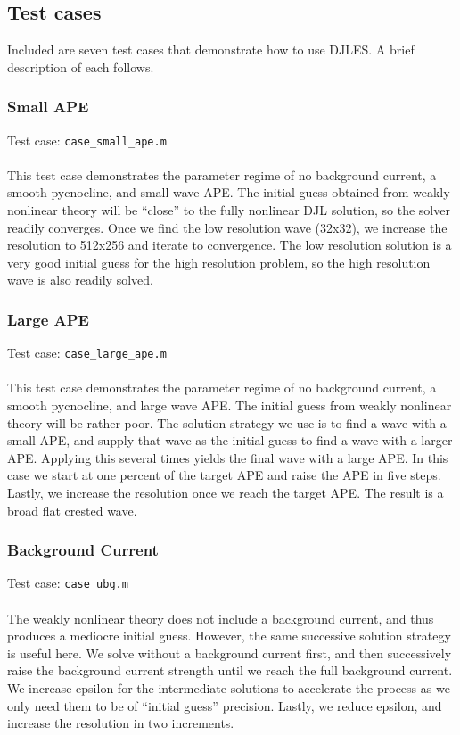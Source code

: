 \documentclass[letterpaper]{article}
\begin{document}
\subsection{Test cases}
Included are seven test cases that demonstrate how to use DJLES. A brief description of each follows.

\subsubsection{Small APE}
Test case: \verb"case_small_ape.m" \\\\
This test case demonstrates the parameter regime of no background current, a smooth pycnocline, and small wave APE.
The initial guess obtained from weakly nonlinear theory will be ``close'' to the fully nonlinear DJL solution, so the solver readily converges.
Once we find the low resolution wave (32x32), we increase the resolution to 512x256 and iterate to convergence.
The low resolution solution is a very good initial guess for the high resolution problem, so the high resolution wave is also readily solved.

\subsubsection{Large APE}
Test case: \verb"case_large_ape.m" \\\\
This test case demonstrates the parameter regime of no background current, a smooth pycnocline, and large wave APE.
The initial guess from weakly nonlinear theory will be rather poor. 
The solution strategy we use is to find a wave with a small APE, and supply that wave as the initial guess to find a wave with a larger APE.
Applying this several times yields the final wave with a large APE.
In this case we start at one percent of the target APE and raise the APE in five steps.
Lastly, we increase the resolution once we reach the target APE.
The result is a broad flat crested wave.

\subsubsection{Background Current}
Test case: \verb"case_ubg.m" \\\\
The weakly nonlinear theory does not include a background current, and thus produces a mediocre initial guess.
However, the same successive solution strategy is useful here.
We solve without a background current first, and then successively raise the background current strength until we reach the full background current.
We increase epsilon for the intermediate solutions to accelerate the process as we only need them to be of ``initial guess'' precision.
Lastly, we reduce epsilon, and increase the resolution in two increments.
\end{document}
